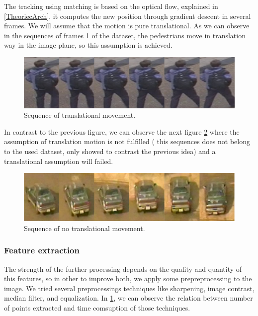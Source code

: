 The tracking using matching is based on the optical flow, explained in \ref{TheoriecArch}, it computes the new position through gradient descent in several frames. We will assume that the motion is pure translational. As we can observe in the sequences of frames \ref{track1w} of the dataset, the pedestrians move in translation way in the image plane, so this assumption is achieved. 


\begin{figure}[H]
\centering         
\includegraphics[width=0.9\linewidth]{changeCamera/tomeu.png}
\caption{Sequence of translational movement.} \label{track1w}
\end{figure}

In contrast to the previous figure, we can observe the next figure \ref{track2w} where the assumption of translation motion is not fulfilled ( this sequences does not belong to the used dataset, only showed to contrast the previous idea) and a translational assumption will failed.

\begin{figure}[H]
\centering         
\includegraphics[width=0.9\linewidth]{changeCamera/out2.png}
\caption{Sequence of no translational movement.} \label{track2w}
\end{figure}





\subsubsection{Feature extraction}\label{exper:validation}

The strength of the further processing depends on the quality and quantity of this features, so in other to improve both, we apply some prepreprocessing to the image. We tried several preprocessings techniques like sharpening, image contrast, median filter, and equalization. In \ref{track1w}, we can observe the relation between number of points extracted and time comsuption of those techniques.




